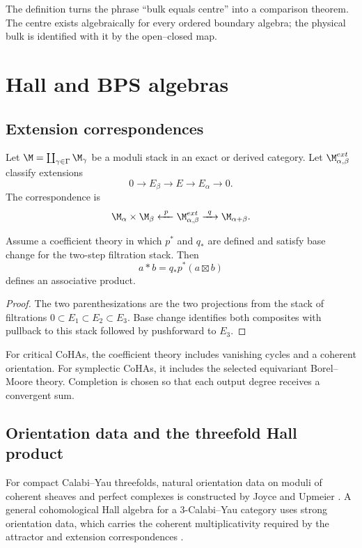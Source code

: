 The definition turns the phrase ``bulk equals centre'' into a comparison theorem. The centre exists algebraically for every ordered boundary algebra; the physical bulk is identified with it by the open--closed map.

\part{Hall and BPS algebras}

\chapter{Extension correspondences}
Let $\M=\coprod_{\gamma\in\Gamma}\M_\gamma$ be a moduli stack in an exact or derived category. Let $\M^{\mathrm{ext}}_{\alpha,\beta}$ classify extensions
\[
 0\longrightarrow E_\beta\longrightarrow E\longrightarrow E_\alpha\longrightarrow0.
\]
The correspondence is
\[
 \M_\alpha\times\M_\beta
 \xleftarrow{\ p\ }
 \M^{\mathrm{ext}}_{\alpha,\beta}
 \xrightarrow{\ q\ }
 \M_{\alpha+\beta}.
\]

\begin{theorem}
Assume a coefficient theory in which $p^*$ and $q_*$ are defined and satisfy base change for the two-step filtration stack. Then
\[
 a*b=q_*p^*(a\boxtimes b)
\]
defines an associative product.
\end{theorem}
\begin{proof}
The two parenthesizations are the two projections from the stack of filtrations $0\subset E_1\subset E_2\subset E_3$. Base change identifies both composites with pullback to this stack followed by pushforward to $E_3$.
\end{proof}

For critical CoHAs, the coefficient theory includes vanishing cycles and a coherent orientation. For symplectic CoHAs, it includes the selected equivariant Borel--Moore theory. Completion is chosen so that each output degree receives a convergent sum.

\chapter{Orientation data and the threefold Hall product}
For compact Calabi--Yau threefolds, natural orientation data on moduli of coherent sheaves and perfect complexes is constructed by Joyce and Upmeier \cite{JoyceUpmeier}.  A general cohomological Hall algebra for a $3$-Calabi--Yau category uses strong orientation data, which carries the coherent multiplicativity required by the attractor and extension correspondences \cite{KPS}.

